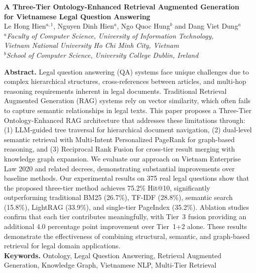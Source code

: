 \documentclass[11pt,a4paper]{article}
\begin{document}
\begin{center}
{\Large\bfseries A Three-Tier Ontology-Enhanced Retrieval Augmented Generation\\[0.3em] for Vietnamese Legal Question Answering}\\[1.5em]

{\normalsize
Le Hong Hien$^{a,1}$, Nguyen Dinh Hien$^{a}$, Ngo Quoc Hung$^{b}$ and Dang Viet Dung$^{a}$\\[0.5em]
$^a$\textit{Faculty of Computer Science, University of Information Technology,}\\
\textit{Vietnam National University Ho Chi Minh City, Vietnam}\\
$^b$\textit{School of Computer Science, University College Dublin, Ireland}\\[1em]
}
\end{center}

\noindent\textbf{Abstract.} Legal question answering (QA) systems face unique challenges due to complex hierarchical structures, cross-references between articles, and multi-hop reasoning requirements inherent in legal documents. Traditional Retrieval Augmented Generation (RAG) systems rely on vector similarity, which often fails to capture semantic relationships in legal texts. This paper proposes a Three-Tier Ontology-Enhanced RAG architecture that addresses these limitations through: (1) LLM-guided tree traversal for hierarchical document navigation, (2) dual-level semantic retrieval with Multi-Intent Personalized PageRank for graph-based reasoning, and (3) Reciprocal Rank Fusion for cross-tier result merging with knowledge graph expansion. We evaluate our approach on Vietnam Enterprise Law 2020 and related decrees, demonstrating substantial improvements over baseline methods. Our experimental results on 375 real legal questions show that the proposed three-tier method achieves 75.2\% Hit@10, significantly outperforming traditional BM25 (26.7\%), TF-IDF (28.8\%), semantic search (15.8\%), LightRAG (33.9\%), and single-tier PageIndex (35.2\%). Ablation studies confirm that each tier contributes meaningfully, with Tier~3 fusion providing an additional 4.0 percentage point improvement over Tier~1+2 alone. These results demonstrate the effectiveness of combining structural, semantic, and graph-based retrieval for legal domain applications.\\[0.5em]

\noindent\textbf{Keywords.} Ontology, Legal Question Answering, Retrieval Augmented Generation, Knowledge Graph, Vietnamese NLP, Multi-Tier Retrieval
\end{document}
